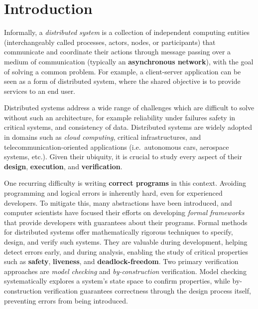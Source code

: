 \chapter{Introduction} \label{chap:intro}
\pagestyle{plain}
\setcounter{page}{1}

Informally, a \textit{distributed system} is a collection of independent 
computing entities (interchangeably called processes, actors, 
nodes, or participants) that communicate and coordinate their 
actions through message passing over a medium of communication 
(typically an \textbf{asynchronous network}), with the goal of solving a 
common problem. For example, a client-server application can be seen 
as a form of distributed system, where the shared objective is to provide 
services to an end user.

Distributed systems address a wide range of challenges which are 
difficult to solve without such an architecture, for example reliability
under failures safety in critical systems, and consistency of data.
Distributed systems are 
widely adopted in domains such as \textit{cloud computing}, critical 
infrastructures, and telecommunication-oriented applications (i.e.\ 
autonomous cars, aerospace systems, etc.). Given their ubiquity, it is 
crucial to study every aspect of their \textbf{design}, \textbf{execution}, 
and \textbf{verification}.

One recurring difficulty is writing \textbf{correct programs} in this 
context. Avoiding programming and logical errors is inherently hard, even 
for experienced developers. To mitigate this, many abstractions have been 
introduced, and computer scientists have focused their efforts on developing 
\textit{formal frameworks} that provide developers with guarantees about 
their programs. Formal methods for distributed systems offer 
mathematically rigorous techniques to specify, design, and 
verify such systems. They are valuable during development, helping 
detect errors early, and during analysis, enabling the study of critical 
properties such as \textbf{safety}, \textbf{liveness}, and 
\textbf{deadlock-freedom}. Two primary verification approaches are 
\textit{model checking} and \textit{by-construction} verification. Model 
checking systematically explores a system's state space to confirm 
properties, while by-construction verification guarantees correctness 
through the design process itself, preventing errors from being introduced. 

